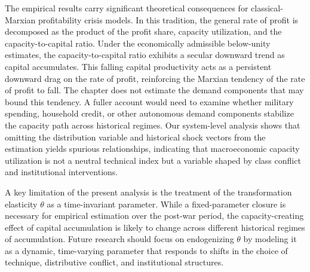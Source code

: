 \documentclass[11pt]{article}
\begin{document}
The empirical results carry significant theoretical consequences for classical-Marxian profitability crisis models. In this tradition, the general rate of profit is decomposed as the product of the profit share, capacity utilization, and the capacity-to-capital ratio. Under the economically admissible below-unity estimates, the capacity-to-capital ratio exhibits a secular downward trend as capital accumulates. This falling capital productivity acts as a persistent downward drag on the rate of profit, reinforcing the Marxian tendency of the rate of profit to fall. The chapter does not estimate the demand components that may bound this tendency. A fuller account would need to examine whether military spending, household credit, or other autonomous demand components stabilize the capacity path across historical regimes. Our system-level analysis shows that omitting the distribution variable and historical shock vectors from the estimation yields spurious relationships, indicating that macroeconomic capacity utilization is not a neutral technical index but a variable shaped by class conflict and institutional interventions.

A key limitation of the present analysis is the treatment of the transformation elasticity $\theta$ as a time-invariant parameter. While a fixed-parameter closure is necessary for empirical estimation over the post-war period, the capacity-creating effect of capital accumulation is likely to change across different historical regimes of accumulation. Future research should focus on endogenizing $\theta$ by modeling it as a dynamic, time-varying parameter that responds to shifts in the choice of technique, distributive conflict, and institutional structures.

\pagebreak


\pagebreak
\appendix

\pagebreak

\end{document}
